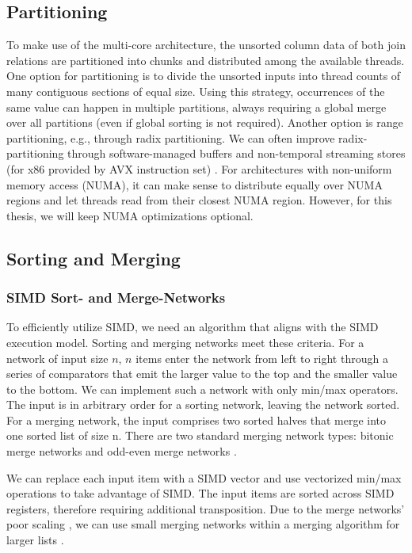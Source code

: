 \subsection{Partitioning}
To make use of the multi-core architecture, the unsorted column data of both join relations are partitioned
into chunks and distributed among the available threads. One option for partitioning is to divide
the unsorted inputs into thread counts of many contiguous sections of equal size. Using this 
strategy, occurrences of the same value can happen in multiple partitions, always requiring a global
merge over all partitions (even if global sorting is not required). Another option is range partitioning, e.g., through radix partitioning.
We can often improve radix-partitioning through software-managed buffers and non-temporal streaming
stores (for x86 provided by AVX instruction set) \cite{DBLP:journals/pvldb/SchuhknechtKD15}.
For architectures with non-uniform memory access
(NUMA), it can make sense to distribute equally over NUMA regions and let threads read from their 
closest NUMA region. However, for this thesis, we will keep NUMA optimizations optional.

\subsection{Sorting and Merging}

\subsubsection{SIMD Sort- and Merge-Networks}

To efficiently utilize SIMD, we need an algorithm that aligns with the SIMD execution model. 
Sorting and merging networks meet these criteria. 
For a network of input size $n$, $n$ items enter the network from left to right through a series of 
comparators that emit the larger value to the top and the smaller value to the bottom. We can
implement such a network with only min/max operators. The input is in arbitrary order for a 
sorting network, leaving the network sorted. For a merging network, the input comprises two sorted
halves that merge into one sorted list of size n. There are two standard merging network types:
bitonic merge networks and odd-even merge networks \cite{10.14778/1454159.1454171}. 

We can replace each input item with a SIMD vector and use vectorized min/max operations to take
advantage of SIMD. The input items are sorted across SIMD registers, therefore requiring additional
transposition.
Due to the merge networks' poor scaling \cite{DBLP:journals/vldb/MullerTA12}, we can use small merging networks within a merging
algorithm for larger lists \cite{4336211}.


